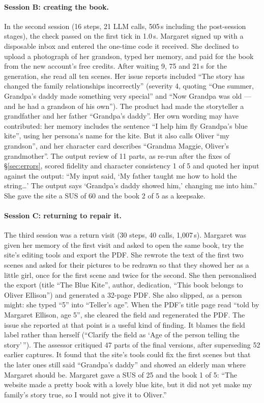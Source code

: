 \documentclass[10pt,twocolumn]{article}
\begin{document}
\paragraph{Session B: creating the book.} In the second session (16 steps, 21 LLM calls, 505\,s including the post-session stages), the check passed on the first tick in 1.0\,s. Margaret signed up with a disposable inbox and entered the one-time code it received. She declined to upload a photograph of her grandson, typed her memory, and paid for the book from the new account's free credits. After waiting 9, 75 and 21\,s for the generation, she read all ten scenes. Her issue reports included ``The story has changed the family relationships incorrectly'' (severity 4, quoting ``One summer, Grandpa's daddy made something very special'' and ``Now Grandpa was old --- and he had a grandson of his own''). The product had made the storyteller a grandfather and her father ``Grandpa's daddy''. Her own wording may have contributed: her memory includes the sentence ``I help him fly Grandpa's blue kite'', using her persona's name for the kite. But it also calls Oliver ``my grandson'', and her character card describes ``Grandma Maggie, Oliver's grandmother''. The output review of 11 parts, as re-run after the fixes of \S\ref{sec:errors}, scored fidelity and character consistency 1 of 5 and quoted her input against the output: ``My input said, `My father taught me how to hold the string\ldots' The output says `Grandpa's daddy showed him,' changing me into him.'' She gave the site a SUS of 60 and the book 2 of 5 as a keepsake.

\paragraph{Session C: returning to repair it.} The third session was a return visit (30 steps, 40 calls, 1,007\,s). Margaret was given her memory of the first visit and asked to open the same book, try the site's editing tools and export the PDF. She rewrote the text of the first two scenes and asked for their pictures to be redrawn so that they showed her as a little girl, once for the first scene and twice for the second. She then personalised the export (title ``The Blue Kite'', author, dedication, ``This book belongs to Oliver Ellison'') and generated a 32-page PDF. She also slipped, as a person might: she typed ``5'' into ``Teller's age''. When the PDF's title page read ``told by Margaret Ellison, age 5'', she cleared the field and regenerated the PDF. The issue she reported at that point is a useful kind of finding. It blames the field label rather than herself (``Clarify the field as `Age of the person telling the story'\,''). The assessor critiqued 47 parts of the final versions, after superseding 52 earlier captures. It found that the site's tools could fix the first scenes but that the later ones still said ``Grandpa's daddy'' and showed an elderly man where Margaret should be. Margaret gave a SUS of 25 and the book 1 of 5: ``The website made a pretty book with a lovely blue kite, but it did not yet make my family's story true, so I would not give it to Oliver.''
\end{document}
